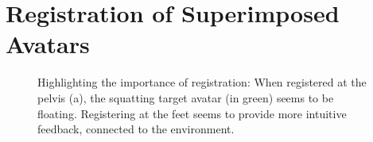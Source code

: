 
\chapter{Registration of Superimposed Avatars \label{chap:registration}}
\begin{figure}[ht]
	\centering
	\caption{Highlighting the importance of registration: When registered at the pelvis (a), the squatting target avatar (in green) seems to be floating. Registering at the feet seems to provide more intuitive feedback, connected to the environment.}
	\label{fig:registrationComparison}
\end{figure}

